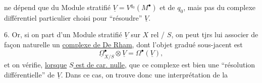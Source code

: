 ne dépend que du Module stratifié $\underline V=V^{q_0}(M^\bullet)$ et de  $q_0$, mais pas du complexe différentiel particulier choisi pour ``résoudre'' $\underline V$.

6. Or,  si on part d'un Module stratifié $\underline V$ sur $X$ rel / $S$, on peut tjrs lui associer de façon naturelle un \uline{complexe de De Rham}, dont l'objet gradué sous-jacent est
\[
\underline\Omega^\bullet_{X/S}\otimes\underline V=\Omega^\bullet(\underline V),
\]
et on vérifie, \uline{lorsque}  \uline{$S$ est de car. nulle}, que ce complexe est bien une ``résolution différentielle'' de $\underline V$.
Dans ce cas, on trouve donc une interprétation  de la
